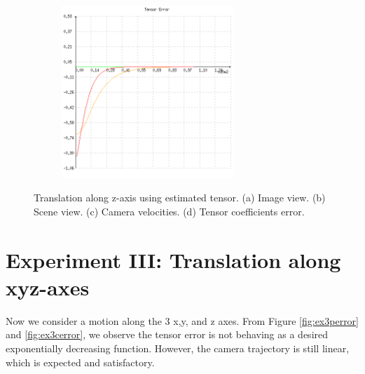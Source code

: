 \begin{figure}[ht!]
\begin{mdframed}[linecolor=black!30,backgroundcolor=black!5]
\begin{subfigure}{.48\textwidth}
    \caption{}
    \label{fig:ex2cvelocity}
  \end{subfigure}
  \begin{subfigure}{.48\textwidth}
    \centering
    \includegraphics[width=65mm]{figures/plots/ex2cerror.png}
    \caption{}
    \label{fig:ex2cerror}
  \end{subfigure}
  \caption{Translation along z-axis using estimated tensor. (a) Image view. (b) Scene view. (c) Camera velocities. (d) Tensor coefficients error.}
  \label{fig:ex2c}
\end{mdframed}
\end{figure}

\section{Experiment III: Translation along xyz-axes}
Now we consider a motion along the 3 x,y, and z axes. From Figure \ref{fig:ex3perror} and \ref{fig:ex3cerror}, we observe the tensor error is not behaving as a desired exponentially decreasing function. However, the camera trajectory is still linear, which is expected and satisfactory.

